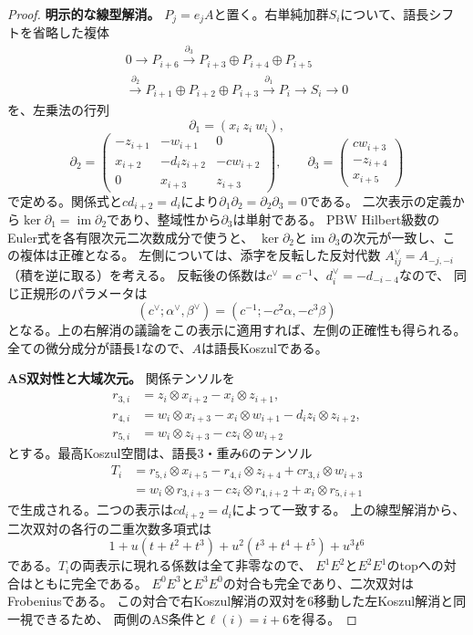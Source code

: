 \documentclass[11pt,a4paper]{ltjsarticle}
\theoremstyle{definition}
\begin{document}
\begin{proof}
\par\smallskip\noindent\textbf{明示的な線型解消。}\quad
$P_j=e_jA$と置く。右単純加群$S_i$について、語長シフトを省略した複体
\begin{multline*}
0\longrightarrow P_{i+6}\xrightarrow{\partial_3}
P_{i+3}\oplus P_{i+4}\oplus P_{i+5}\\
\xrightarrow{\partial_2}P_{i+1}\oplus P_{i+2}\oplus P_{i+3}
\xrightarrow{\partial_1}P_i\longrightarrow S_i\longrightarrow0
\end{multline*}
を、左乗法の行列
\[
\partial_1=(x_i\ z_i\ w_i),
\]
\[
\partial_2=\begin{pmatrix}
-z_{i+1}&-w_{i+1}&0\\
x_{i+2}&-d_i z_{i+2}&-c w_{i+2}\\
0&x_{i+3}&z_{i+3}
\end{pmatrix},\qquad
\partial_3=\begin{pmatrix}c w_{i+3}\\-z_{i+4}\\x_{i+5}\end{pmatrix}
\]
で定める。関係式と$cd_{i+2}=d_i$により$\partial_1\partial_2=\partial_2\partial_3=0$である。
二次表示の定義から$\ker \partial_1=\operatorname{im}\partial_2$であり、整域性から$\partial_3$は単射である。
PBW Hilbert級数のEuler式を各有限次元二次数成分で使うと、
$\ker \partial_2$と$\operatorname{im}\partial_3$の次元が一致し、この複体は正確となる。
左側については、添字を反転した反対代数
$A^\vee_{ij}=A_{-j,-i}$（積を逆に取る）を考える。
反転後の係数は$c^\vee=c^{-1}$、$d_i^\vee=-d_{-i-4}$なので、
同じ正規形のパラメータは
\[
 (c^\vee;\alpha^\vee,\beta^\vee)
 =(c^{-1};-c^2\alpha,-c^3\beta)
\]
となる。上の右解消の議論をこの表示に適用すれば、左側の正確性も得られる。
全ての微分成分が語長1なので、$A$は語長Koszulである。

\par\smallskip\noindent\textbf{AS双対性と大域次元。}\quad
関係テンソルを
\begin{align*}
r_{3,i}&=z_i\otimes x_{i+2}-x_i\otimes z_{i+1},\\
r_{4,i}&=w_i\otimes x_{i+3}-x_i\otimes w_{i+1}-d_i z_i\otimes z_{i+2},\\
r_{5,i}&=w_i\otimes z_{i+3}-c z_i\otimes w_{i+2}
\end{align*}
とする。最高Koszul空間は、語長3・重み6のテンソル
\begin{align*}
T_i&=r_{5,i}\otimes x_{i+5}-r_{4,i}\otimes z_{i+4}
       +c r_{3,i}\otimes w_{i+3}\\
&=w_i\otimes r_{3,i+3}-c z_i\otimes r_{4,i+2}
       +x_i\otimes r_{5,i+1}
\end{align*}
で生成される。二つの表示は$cd_{i+2}=d_i$によって一致する。
上の線型解消から、二次双対の各行の二重次数多項式は
\[
1+u(t+t^2+t^3)+u^2(t^3+t^4+t^5)+u^3t^6
\]
である。$T_i$の両表示に現れる係数は全て非零なので、
$E^1E^2$と$E^2E^1$のtopへの対合はともに完全である。
$E^0E^3$と$E^3E^0$の対合も完全であり、二次双対はFrobeniusである。
この対合で右Koszul解消の双対を6移動した左Koszul解消と同一視できるため、
両側のAS条件と$\ell(i)=i+6$を得る。


\end{proof}
\end{document}
